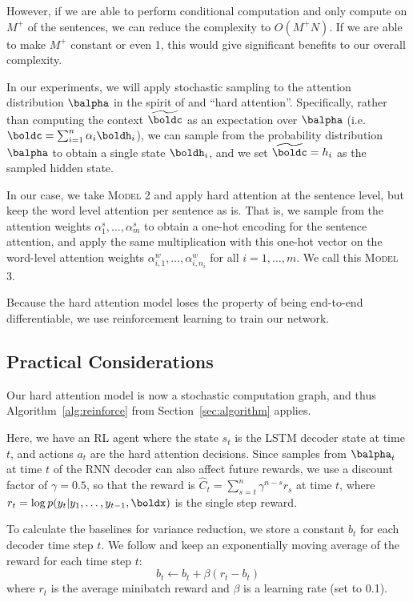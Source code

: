 \documentclass[12pt]{report}
\begin{document}
However, if we are able to perform conditional computation and only compute on $M^+$ of the sentences, we can reduce the complexity to $O(M^+N)$. If we are able to make $M^+$ constant or even 1, this would give significant benefits to our overall complexity.

In our experiments, we will apply stochastic sampling to the attention distribution $\balpha$ in the spirit of \citet{xu2015captioning} and ``hard attention''.
Specifically, rather than computing the context $\widetilde{\boldc}$ as an expectation over $\balpha$ (i.e. $\boldc = \sum_{i=1}^n \alpha_i \boldh_i$), we can sample from the probability distribution $\balpha$ to obtain a single state $\boldh_i$, and we set $\widetilde{\boldc} = h_i$ as the sampled hidden state.

In our case, we take \textsc{Model 2} and apply hard attention at the sentence level, but keep the word level attention per sentence as is. That is, we sample from the attention weights $\alpha_1^s, \ldots, \alpha_m^s$ to obtain a one-hot encoding for the sentence attention, and apply the same multiplication with this one-hot vector on the word-level attention weights $\alpha_{i,1}^w, \ldots, \alpha_{i,n_i}^w$ for all $i = 1, \ldots, m$. We call this \textsc{Model 3}.


Because the hard attention model loses the property of being end-to-end differentiable, we use reinforcement learning to train our network.


\subsection{Practical Considerations}
\label{sec:practical}

Our hard attention model is now a stochastic computation graph, and thus Algorithm~\ref{alg:reinforce} from Section~\ref{sec:algorithm} applies.

Here, we have an RL agent where the state $s_t$ is the LSTM decoder state at time $t$, and actions $a_t$ are the hard attention decisions.
Since samples from $\balpha_t$ at time $t$ of the RNN decoder can also affect future rewards, we use a discount factor of $\gamma = 0.5$, so that the reward is $\hat{C}_t = \sum_{s = t}^n \gamma^{n-s}r_s$ at time $t$, where $r_t = \log p(y_t | y_1, \ldots, y_{t-1}, \boldx)$ is the single step reward.

To calculate the baselines for variance reduction, we store a constant $b_t$ for each decoder time step $t$. We follow \citet{xu2015captioning} and keep an exponentially moving average of the reward for each time step $t$:
\begin{equation}
b_t \gets b_t + \beta (r_t - b_t)
\end{equation}
where $r_t$ is the average minibatch reward and $\beta$ is a learning rate (set to 0.1).
\end{document}
